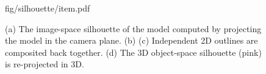 \begin{figure}[t!]
\centering
\begin{overpic} 
[width=\linewidth]
{fig/silhouette/item.pdf}
\end{overpic}
\caption{
% 
% 
(a) The image-space silhouette of the model computed by projecting the model in the camera plane.
(b) 
(c) Independent 2D  outlines are composited back together.
(d) The 3D object-space silhouette (pink) is re-projected in 3D.
% 
% 
} 
\label{fig:silhouette}
\end{figure}